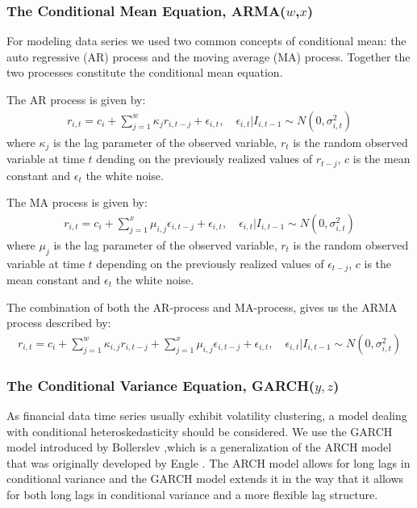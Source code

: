 \subsubsection{The Conditional Mean Equation, ARMA($w$,$x$)}

For modeling data series we used two common concepts of conditional mean: the auto regressive (AR) process and the moving average (MA) process. Together the two processes constitute the conditional mean equation. 

The AR process is given by:
\begin{align}
    r_{i,t}=c_i + \sum_{j=1}^w\kappa_j r_{i,t-j} + \epsilon_{i,t},\quad \epsilon_{i,t} | I_{i,t-1} \sim N(0,{\sigma_{i,t}^2}) \label{ConditionalMeanEquation}
\end{align}
where $\kappa_j$ is the lag parameter of the observed variable, $r_t$ is the random observed variable at time $t$ dending on the previously realized values of $r_{t-j}$, $c$ is the mean constant and $\epsilon_t$ the white noise.

The MA process is given by:
\begin{align}
    r_{i,t}=c_i + \sum_{j=1}^x\mu_{i,j} \epsilon_{i,t-j} + \epsilon_{i,t},\quad \epsilon_{i,t} | I_{i,t-1} \sim N(0,{\sigma_{i,t}^2}) \label{ConditionalMeanEquation}
\end{align}
where $\mu_j$ is the lag parameter of the observed variable, $r_t$ is the random observed variable at time $t$ depending on the previously realized values of $\epsilon_{t-j}$, $c$ is the mean constant and $\epsilon_t$ the white noise.

The combination of both the AR-process and MA-process, gives us the ARMA process described by:
\begin{align}
    r_{i,t}=c_i+\sum_{j=1}^w\kappa_{i,j} r_{i,t-j}+\sum_{j=1}^x\mu_{i,j} \epsilon_{i,t-j}+\epsilon_{i,t},\quad \epsilon_{i,t} | I_{i,t-1} \sim N(0,{\sigma_{i,t}^2}) \label{ConditionalMeanEquation}
\end{align}

\subsubsection{The Conditional Variance Equation, GARCH($y,z$)}
As financial data time series usually exhibit volatility clustering, a model dealing with conditional heteroskedasticity should be considered. We use the GARCH model introduced by Bollerslev \cite{Bollerslev},which is a generalization of the ARCH model that was originally developed by Engle \cite{Engle}. The ARCH model allows for long lags in conditional variance and the GARCH model extends it in the way that it allows for both long lags in conditional variance and a more flexible lag structure.

